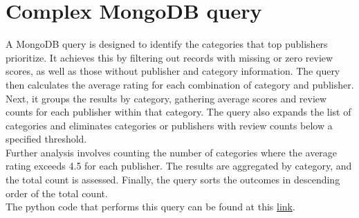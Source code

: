 
\section{Complex MongoDB query}

A MongoDB query is designed to identify the categories that top publishers prioritize.
It achieves this by filtering out records with missing or zero review scores,
as well as those without publisher and category information.
The query then calculates the average rating for each combination of category and publisher. \\
Next, it groups the results by category, gathering average scores and review counts for each publisher
within that category. The query also expands the list of categories and eliminates categories or
publishers with review counts below a specified threshold.\\
Further analysis involves counting the number of categories where the average rating exceeds 4.5 for each publisher.
The results are aggregated by category, and the total count is assessed. Finally, the query sorts the outcomes
in descending order of the total count.\\
The python code that performs this query can be found at this  \href{https://github.com/DavideLigari01/data-science-project/blob/main/notebooks/hypotesis_testing/hypothesis_6.ipynb}{link}.